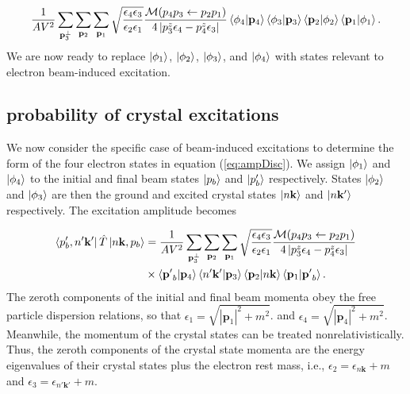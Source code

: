 \documentclass{article}
\begin{document}
\begin{equation}
\label{eq:ampDisc}
\begin{aligned}
    \frac{1}{AV^2}
    \sum_{\mathbf{p}_3^\perp} \sum_{\mathbf{p}_2} \sum_{\mathbf{p}_1}
    \sqrt{\frac{\epsilon_4\epsilon_3}{\epsilon_2\epsilon_1}}
    \frac{\mathcal{M}(p_4p_3\leftarrow p_2p_1)}
    {4\left|p_3^z\epsilon_4 - p_4^z\epsilon_3\right|}
    \bra{\phi_4}\ket{\mathbf{p}_4}
    \bra{\phi_3}\ket{\mathbf{p}_3}
    \bra{\mathbf{p}_2}\ket{\phi_2}
    \bra{\mathbf{p}_1}\ket{\phi_1}.
\end{aligned}
\end{equation}
%
We are now ready to replace $\ket{\phi_1}$, $\ket{\phi_2}$, $\ket{\phi_3}$, and $\ket{\phi_4}$ with states relevant to electron beam-induced excitation.

\subsection{probability of crystal excitations}
\label{sec:crystal}

We now consider the specific case of beam-induced excitations
to determine the form of the four electron states in equation (\ref{eq:ampDisc}).
We assign $\ket{\phi_1}$ and $\ket{\phi_4}$ to the initial and final beam states $\ket{p_b}$ and $\ket{p'_b}$ respectively.  States $\ket{\phi_2}$ and $\ket{\phi_3}$ are then the ground and excited crystal states $\ket{n\mathbf{k}}$ and $\ket{n\mathbf{k'}}$ respectively.  The excitation amplitude becomes

\begin{equation}
\label{eq:crystalStates}
\begin{aligned}
    \bra{p'_b, n'\mathbf{k'}} \hat{T} \ket{n\mathbf{k},p_b}
    &=
    \frac{1}{AV^2}
    \sum_{\mathbf{p}_3^\perp} \sum_{\mathbf{p}_2} \sum_{\mathbf{p}_1}
    \sqrt{\frac{\epsilon_4\epsilon_3}{\epsilon_2\epsilon_1}}
    \frac{\mathcal{M}(p_4p_3\leftarrow p_2p_1)}
    {4\left|p_3^z\epsilon_4 - p_4^z\epsilon_3\right|}
    \\&\times
    \bra{\mathbf{p'}_b}\ket{\mathbf{p}_4}
    \bra{n'\mathbf{k'}}\ket{\mathbf{p}_3}
    \bra{\mathbf{p}_2}\ket{n\mathbf{k}}
    \bra{\mathbf{p}_1}\ket{\mathbf{p'}_b}.
\end{aligned}
\end{equation}
%
The zeroth components of the initial and final beam momenta obey the free particle dispersion relations, so that
$\epsilon_1 = \sqrt{|\mathbf{p}_1|^2 + m^2}$.
and
$\epsilon_4 = \sqrt{|\mathbf{p}_4|^2 + m^2}$.
Meanwhile, the momentum of the crystal states can be treated nonrelativistically.
Thus, the zeroth components of the crystal state momenta are the energy eigenvalues of their crystal states plus the electron rest mass, i.e., $\epsilon_2=\epsilon_{n\mathbf{k}} + m$ and $\epsilon_3=\epsilon_{n'\mathbf{k'}} + m$.
\end{document}
